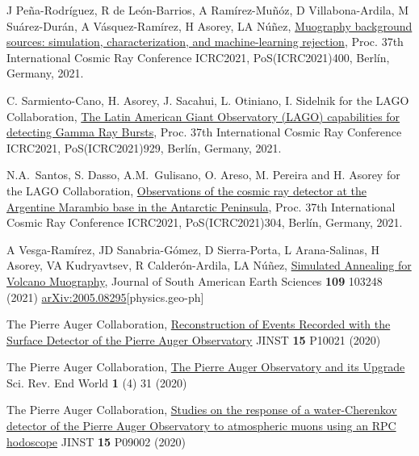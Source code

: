 \begin{etaremune}
\item {} J Peña-Rodríguez, R de León-Barrios, A Ramírez-Muñóz, D Villabona-Ardila, M Suárez-Durán, A Vásquez-Ramírez, H Asorey, LA Núñez, \href{https://doi.org/10.22323/1.395.0400}{Muography background sources: simulation, characterization, and machine-learning rejection}, \en Proc.
37th International Cosmic Ray Conference ICRC2021, PoS(ICRC2021)400, Berlín, Germany, 2021.

\item {} C. Sarmiento-Cano, H. Asorey, J. Sacahui, L. Otiniano, I. Sidelnik for the LAGO Collaboration, \href{https://doi.org/10.22323/1.395.0929}{The Latin American Giant Observatory (LAGO) capabilities for detecting Gamma Ray Bursts}, \en Proc.
37th International Cosmic Ray Conference ICRC2021, PoS(ICRC2021)929, Berlín, Germany, 2021.

\item {} N.A.\ Santos, S. Dasso, A.M.\ Gulisano, O. Areso, M. Pereira and H. Asorey for the LAGO Collaboration, \href{https://doi.org/10.22323/1.395.304}{Observations of the cosmic ray detector at the Argentine Marambio base in the Antarctic Peninsula}, \en Proc.
37th International Cosmic Ray Conference ICRC2021, PoS(ICRC2021)304, Berlín, Germany, 2021.

\item {} A Vesga-Ramírez, JD Sanabria-Gómez, D Sierra-Porta, L Arana-Salinas, H Asorey, VA Kudryavtsev, R Calderón-Ardila, LA Núñez, \href{https://doi.org/10.1016/j.jsames.2021.103248}{{Simulated Annealing for Volcano Muography}}, Journal of South American Earth Sciences {\textbf{109}} 103248 (2021) \href{https://arxiv.org/abs/2005.08295}{arXiv:2005.08295}[physics.geo-ph]

\item {}The Pierre Auger Collaboration, \href{https://doi.org/10.1088/1748-0221/15/10/P10021}{Reconstruction of Events Recorded with the Surface Detector of the Pierre Auger Observatory} JINST {\textbf{15}} P10021 (2020) %

\item {}The Pierre Auger Collaboration, \href{https://doi.org/10.52712/sciencereviews.v1i4.31}{The Pierre Auger Observatory and its Upgrade} Sci.
Rev. End World {\textbf{1}} (4) 31 (2020)

\item {}The Pierre Auger Collaboration, \href{https://doi.org/10.1088/1748-0221/15/09/P09002}{Studies on the response of a water-Cherenkov detector of the Pierre Auger Observatory to atmospheric muons using an RPC hodoscope} JINST {\textbf{15}} P09002 (2020) %


\end{etaremune}
